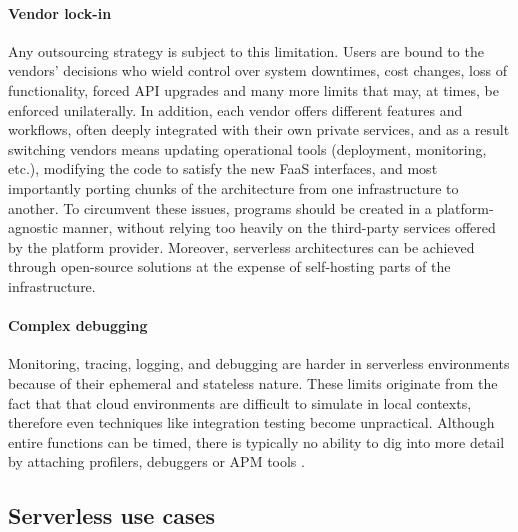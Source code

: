 \paragraph{\textbf{Vendor lock-in}} Any outsourcing strategy is subject to this limitation.
Users are bound to the vendors' decisions who wield control over
system downtimes, cost changes, loss of functionality, forced API upgrades and many
more limits that may, at times, be enforced unilaterally.
In addition, each vendor offers different features and workflows,
often deeply integrated with their own private services,
and as a result switching vendors means updating operational tools (deployment, monitoring, etc.),
modifying the code to satisfy the new FaaS interfaces, and most importantly
porting chunks of the architecture from one infrastructure to another.
To circumvent these issues, programs should be created in a platform-agnostic manner,
without relying too heavily on the third-party services offered by the platform provider.
Moreover, serverless architectures can be achieved through open-source solutions
at the expense of self-hosting parts of the infrastructure.

\paragraph{\textbf{Complex debugging}} Monitoring, tracing, logging, and debugging
are harder in serverless environments because of their ephemeral and stateless nature.
These limits originate from the fact that that cloud environments are difficult
to simulate in local contexts, therefore even techniques like integration testing become unpractical.
Although entire functions can be timed, there is typically no
ability to dig into more detail by attaching profilers, debuggers or APM tools \cite{debug}.

\subsection{Serverless use cases}

